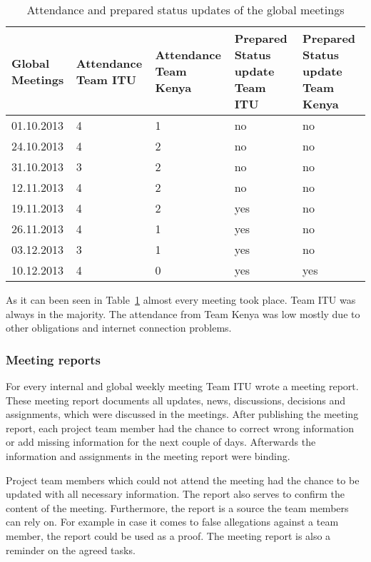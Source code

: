 \begin{table}[htb]
	\centering
	\begin{tabular}{ | l |  p{2.5cm} |  p{2.5cm} |  p{3cm} |  p{3cm} |}
    		\hline
   		Global Meetings & Attendance Team ITU &  Attendance Team Kenya & Prepared Status update Team ITU & Prepared Status update Team Kenya\\ \hline
    		01.10.2013 & 4 & 1 & no & no \\ \hline
    		24.10.2013 & 4 & 2 & no & no \\ \hline
    		31.10.2013 & 3 & 2 & no & no \\ \hline
    		12.11.2013 & 4 & 2 & no & no \\ \hline
    		19.11.2013 & 4 & 2 & yes & no \\ \hline
    		26.11.2013 & 4 & 1 & yes & no \\ \hline
    		03.12.2013 & 3 & 1 & yes & no \\ \hline
    		10.12.2013 & 4 & 0 & yes & yes \\ \hline
	\end{tabular}
	\caption{Attendance and prepared status updates of the global meetings}
	\label{tab:global_meetings}
\end{table}

As it can been seen in Table~\ref{tab:global_meetings} almost every meeting took place. Team ITU was always in the majority. The attendance from Team Kenya was low mostly due to other obligations and internet connection problems.

\subsubsection {Meeting reports}

For every internal and global weekly meeting Team ITU wrote a meeting report. These meeting report documents all updates, news, discussions, decisions and assignments, which were discussed in the meetings. After publishing the meeting report, each project team member had the chance to correct wrong information or add missing information for the next couple of days. Afterwards the information and assignments in the meeting report were binding.

Project team members which could not attend the meeting had the chance to be updated with all necessary information. The report also serves to confirm the content of the meeting. Furthermore, the report is a source the team members can rely on. For example in case it comes to false allegations against a team member, the report could be used as a proof. The meeting report is also a reminder on the agreed tasks.

